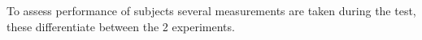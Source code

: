 To assess performance of subjects several measurements are taken during the test, these differentiate between the 2 experiments.